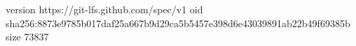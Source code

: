 version https://git-lfs.github.com/spec/v1
oid sha256:8873e9785b017daf25a667b9d29ca5b5457e398d6e43039891ab22b49f69385b
size 73837
